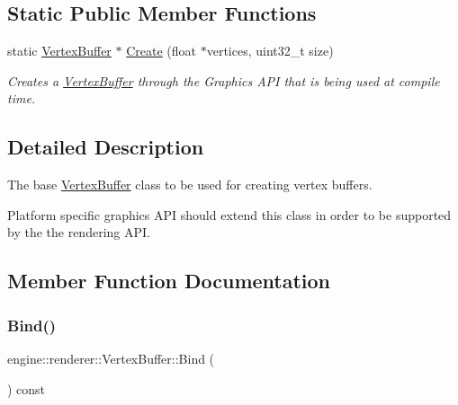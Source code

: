 \subsection*{Static Public Member Functions}
\begin{DoxyCompactItemize}
\item 
static \hyperlink{classengine_1_1renderer_1_1VertexBuffer}{Vertex\+Buffer} $\ast$ \hyperlink{classengine_1_1renderer_1_1VertexBuffer_a4c337f1549556946735a47708a55ab9c}{Create} (float $\ast$vertices, uint32\+\_\+t size)
\begin{DoxyCompactList}\small\item\em Creates a \hyperlink{classengine_1_1renderer_1_1VertexBuffer}{Vertex\+Buffer} through the Graphics A\+PI that is being used at compile time. \end{DoxyCompactList}\end{DoxyCompactItemize}


\subsection{Detailed Description}
The base \hyperlink{classengine_1_1renderer_1_1VertexBuffer}{Vertex\+Buffer} class to be used for creating vertex buffers. 

Platform specific graphics A\+PI should extend this class in order to be supported by the the rendering A\+PI. 

\subsection{Member Function Documentation}
\mbox{\label{classengine_1_1renderer_1_1VertexBuffer_a62c7bd816aa10b69d1e903918ecc4414}} 
\subsubsection{\texorpdfstring{Bind()}{Bind()}}
{\footnotesize\ttfamily engine\+::renderer\+::\+Vertex\+Buffer\+::\+Bind (\begin{DoxyParamCaption}{ }\end{DoxyParamCaption}) const\hspace{0.3cm}{\ttfamily [pure virtual]}}



